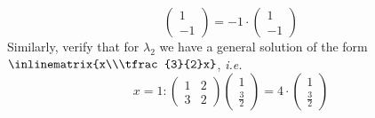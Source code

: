 \begin{exm}
\begin{equation*}
\begin{pmatrix}
			1 \\ -1
		\end{pmatrix}=-1\cdot\begin{pmatrix}
			1 \\ -1
		\end{pmatrix}
	\end{equation*}
	Similarly, verify that for $\lambda_2$ we have a general solution of the form
	$\inlinematrix{x\\\tfrac{3}{2}x}$, \textit{i.e.}
	\begin{equation*}
		x=1:\begin{pmatrix}
			1 & 2 \\
			3 & 2
		\end{pmatrix}\begin{pmatrix}
			1 \\ \tfrac{3}{2}
		\end{pmatrix}=4\cdot\begin{pmatrix}
			1 \\ \tfrac{3}{2}
		\end{pmatrix}
	\end{equation*}
\end{exm}

